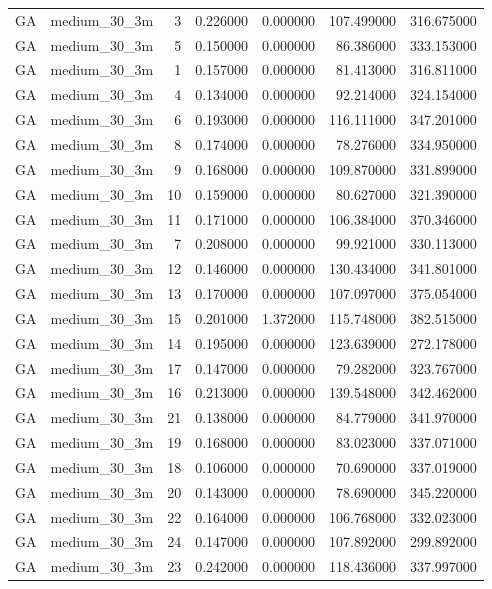 \begin{tabular}{llrrrrr}
GA & medium_30_3m & 3 & 0.226000 & 0.000000 & 107.499000 & 316.675000 \\
GA & medium_30_3m & 5 & 0.150000 & 0.000000 & 86.386000 & 333.153000 \\
GA & medium_30_3m & 1 & 0.157000 & 0.000000 & 81.413000 & 316.811000 \\
GA & medium_30_3m & 4 & 0.134000 & 0.000000 & 92.214000 & 324.154000 \\
GA & medium_30_3m & 6 & 0.193000 & 0.000000 & 116.111000 & 347.201000 \\
GA & medium_30_3m & 8 & 0.174000 & 0.000000 & 78.276000 & 334.950000 \\
GA & medium_30_3m & 9 & 0.168000 & 0.000000 & 109.870000 & 331.899000 \\
GA & medium_30_3m & 10 & 0.159000 & 0.000000 & 80.627000 & 321.390000 \\
GA & medium_30_3m & 11 & 0.171000 & 0.000000 & 106.384000 & 370.346000 \\
GA & medium_30_3m & 7 & 0.208000 & 0.000000 & 99.921000 & 330.113000 \\
GA & medium_30_3m & 12 & 0.146000 & 0.000000 & 130.434000 & 341.801000 \\
GA & medium_30_3m & 13 & 0.170000 & 0.000000 & 107.097000 & 375.054000 \\
GA & medium_30_3m & 15 & 0.201000 & 1.372000 & 115.748000 & 382.515000 \\
GA & medium_30_3m & 14 & 0.195000 & 0.000000 & 123.639000 & 272.178000 \\
GA & medium_30_3m & 17 & 0.147000 & 0.000000 & 79.282000 & 323.767000 \\
GA & medium_30_3m & 16 & 0.213000 & 0.000000 & 139.548000 & 342.462000 \\
GA & medium_30_3m & 21 & 0.138000 & 0.000000 & 84.779000 & 341.970000 \\
GA & medium_30_3m & 19 & 0.168000 & 0.000000 & 83.023000 & 337.071000 \\
GA & medium_30_3m & 18 & 0.106000 & 0.000000 & 70.690000 & 337.019000 \\
GA & medium_30_3m & 20 & 0.143000 & 0.000000 & 78.690000 & 345.220000 \\
GA & medium_30_3m & 22 & 0.164000 & 0.000000 & 106.768000 & 332.023000 \\
GA & medium_30_3m & 24 & 0.147000 & 0.000000 & 107.892000 & 299.892000 \\
GA & medium_30_3m & 23 & 0.242000 & 0.000000 & 118.436000 & 337.997000 \\

\end{tabular}
